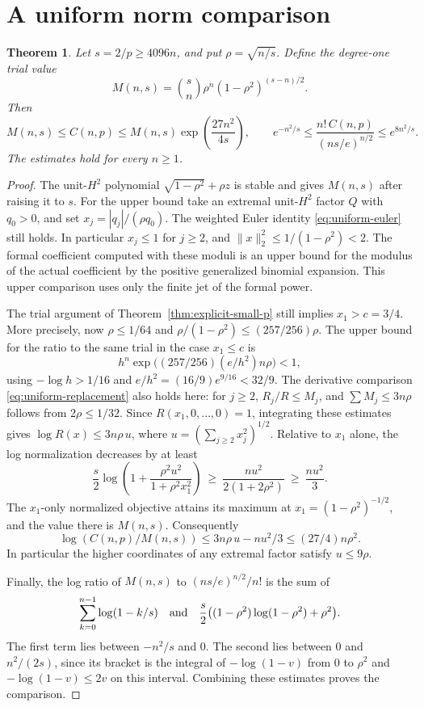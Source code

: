 \documentclass[11pt]{article}
\newtheorem{theorem}{Theorem}
\begin{document}
\section{A uniform norm comparison}

\begin{theorem}\label{thm:uniform-comparison}
Let \(s=2/p\geq4096n\), and put \(\rho=\sqrt{n/s}\).
Define the degree-one trial value
\[
 M(n,s)=\binom{s}{n}\rho^n(1-\rho^2)^{(s-n)/2}.
\]
Then
\[
 M(n,s)\leq C(n,p)\leq M(n,s)\exp\!\left(\frac{27n^2}{4s}\right),
 \qquad
 e^{-n^2/s}\leq
 \frac{n!\,C(n,p)}{(ns/e)^{n/2}}
 \leq e^{8n^2/s}.
\]
The estimates hold for every \(n\geq1\).
\end{theorem}

\begin{proof}
The unit-\(H^2\) polynomial
\(\sqrt{1-\rho^2}+\rho z\) is stable and gives \(M(n,s)\)
after raising it to \(s\).
For the upper bound take an extremal unit-\(H^2\) factor \(Q\)
with \(q_0>0\), and set \(x_j=|q_j|/(\rho q_0)\).
The weighted Euler identity
\eqref{eq:uniform-euler} still holds. In particular
\(x_j\leq1\) for \(j\geq2\), and
\(\|x\|_2^2\leq1/(1-\rho^2)<2\).
The formal coefficient computed with these moduli is an
upper bound for the modulus of the actual coefficient by the
positive generalized binomial expansion.
This upper comparison uses only the finite jet of the formal
power.

The trial argument of Theorem~\ref{thm:explicit-small-p}
still implies \(x_1>c=3/4\). More precisely, now \(\rho\leq1/64\)
and
\(\rho/(1-\rho^2)\leq (257/256)\rho\).
The upper bound for the ratio to the same trial in the
case \(x_1\leq c\) is
\[
 h^n\exp\bigl((257/256)(e/h^2)n\rho\bigr)<1,
\]
using \(-\log h>1/16\) and
\(e/h^2=(16/9)e^{9/16}<32/9\).
The derivative comparison \eqref{eq:uniform-replacement} also
holds here: for \(j\geq2\), \(R_j/R\leq M_j\), and
\(\sum M_j\leq3n\rho\) follows from \(2\rho\leq1/32\).
Since \(R(x_1,0,\ldots,0)=1\), integrating these estimates
gives \(\log R(x)\leq3n\rho\,u\), where
\(u=(\sum_{j\geq2}x_j^2)^{1/2}\).
Relative to \(x_1\) alone, the log normalization decreases by
at least
\[
 \frac{s}{2}\log\left(1+
      \frac{\rho^2 u^2}{1+\rho^2 x_1^2}\right)
 \ \geq\ \frac{n u^2}{2(1+2\rho^2)}\ \geq\ \frac{nu^2}{3}.
\]
The \(x_1\)-only normalized objective attains its maximum at
\(x_1=(1-\rho^2)^{-1/2}\), and the value there is \(M(n,s)\).
Consequently
\[
 \log(C(n,p)/M(n,s))
 \leq 3n\rho\,u-nu^2/3\leq(27/4)n\rho^2.
\]
In particular the higher coordinates of any extremal factor
satisfy \(u\leq9\rho\).

Finally, the log ratio of \(M(n,s)\) to \((ns/e)^{n/2}/n!\)
is the sum of
\[
 \sum_{k=0}^{n-1}\log(1-k/s)
 \quad\hbox{and}\quad
 \frac{s}{2}\bigl((1-\rho^2)\log(1-\rho^2)+\rho^2\bigr).
\]
The first term lies between \(-n^2/s\) and \(0\).
The second lies between \(0\) and \(n^2/(2s)\), since its
bracket is the integral of \(-\log(1-v)\) from \(0\)
to \(\rho^2\) and \(-\log(1-v)\leq2v\) on this interval.
Combining these estimates proves the comparison.
\end{proof}
\end{document}
